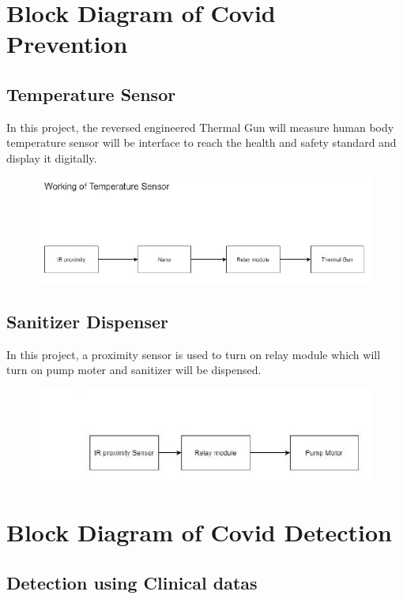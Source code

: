 \documentclass[a4paper,12pt]{report}
\begin{document}
\section{Block Diagram of Covid Prevention}
\subsection{Temperature Sensor}
In this project, the reversed engineered Thermal Gun will measure human body temperature
sensor will be interface to reach the health and safety standard and display it digitally.
\begin{figure}[h] %
   \begin{center}
   \includegraphics[scale=0.8]{medical ventilation.jpg}
  \end{center}
  \end{figure}
  \pagebreak
\subsection{Sanitizer Dispenser}
In this project, a proximity sensor is used to turn on relay module which will turn on pump moter and sanitizer will be dispensed.
\begin{figure}[h] %
   \begin{center}
   \includegraphics[scale=0.8]{block diagram u v c.jpg}
  \end{center}
  \end{figure}
  \section{Block Diagram of Covid Detection}
  \subsection{Detection using Clinical datas}
\end{document}
